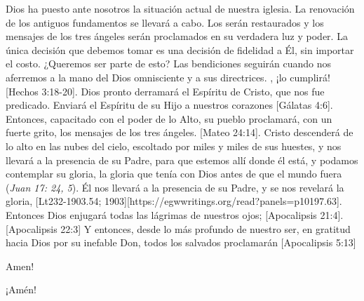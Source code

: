 Dios ha puesto ante nosotros la situación actual de nuestra iglesia. La renovación de los antiguos fundamentos se llevará a cabo. Los  serán restaurados y los mensajes de los tres ángeles serán proclamados en su verdadera luz y poder. La única decisión que debemos tomar es una decisión de fidelidad a Él, sin importar el costo. ¿Queremos ser parte de esto? Las bendiciones seguirán cuando nos aferremos a la mano del Dios omnisciente y a sus directrices. , ¡lo cumplirá! [Hechos 3:18-20]. Dios pronto derramará el Espíritu de Cristo, que nos fue predicado. Enviará el Espíritu de su Hijo a nuestros corazones [Gálatas 4:6].  Entonces, capacitado con el poder de lo Alto, su pueblo proclamará, con un fuerte grito, los mensajes de los tres ángeles. [Mateo 24:14]. Cristo descenderá de lo alto en las nubes del cielo, escoltado por miles y miles de sus huestes, y nos llevará a la presencia de su Padre, para que estemos allí donde él está, y podamos contemplar su gloria, la gloria que tenía con Dios antes de que el mundo fuera (\textit{Juan 17: 24, 5}). Él nos llevará a la presencia de su Padre, y se nos revelará la gloria, [Lt232-1903.54; 1903][https://egwwritings.org/read?panels=p10197.63]. Entonces Dios enjugará todas las lágrimas de nuestros ojos; [Apocalipsis 21:4]. [Apocalipsis 22:3] Y entonces, desde lo más profundo de nuestro ser, en gratitud hacia Dios por su inefable Don, todos los salvados  proclamarán [Apocalipsis 5:13]


Amen!


¡Amén!





% 
